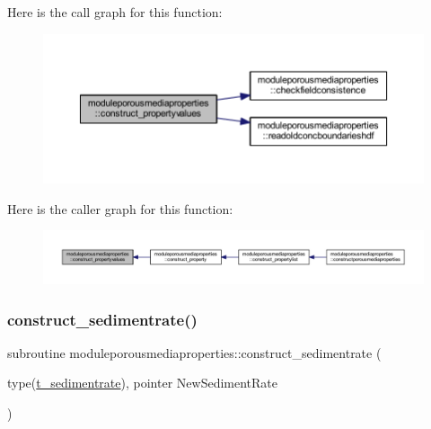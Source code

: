Here is the call graph for this function\+:\nopagebreak
\begin{figure}[H]
\begin{center}
\leavevmode
\includegraphics[width=350pt]{namespacemoduleporousmediaproperties_a72fa2352db155b8e701aa97c7aad155c_cgraph}
\end{center}
\end{figure}
Here is the caller graph for this function\+:\nopagebreak
\begin{figure}[H]
\begin{center}
\leavevmode
\includegraphics[width=350pt]{namespacemoduleporousmediaproperties_a72fa2352db155b8e701aa97c7aad155c_icgraph}
\end{center}
\end{figure}
\mbox{\label{namespacemoduleporousmediaproperties_abfc3b112a762e28d4f711dfe4a5d7d3d}} 
\subsubsection{\texorpdfstring{construct\+\_\+sedimentrate()}{construct\_sedimentrate()}}
{\footnotesize\ttfamily subroutine moduleporousmediaproperties\+::construct\+\_\+sedimentrate (\begin{DoxyParamCaption}\item[{type(\mbox{\hyperlink{structmoduleporousmediaproperties_1_1t__sedimentrate}{t\+\_\+sedimentrate}}), pointer}]{New\+Sediment\+Rate }\end{DoxyParamCaption})\hspace{0.3cm}{\ttfamily [private]}}

